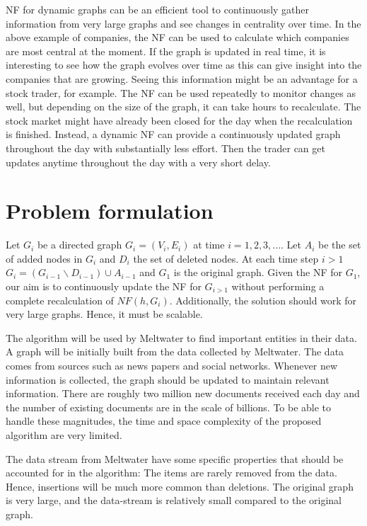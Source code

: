 NF for dynamic graphs can be an efficient tool to continuously gather information from very large graphs and see changes in centrality over time. In the above example of companies, the NF can be used to calculate which companies are most central at the moment. If the graph is updated in real time, it is interesting to see how the graph evolves over time as this can give insight into the companies that are growing. Seeing this information might be an advantage for a stock trader, for example. The NF can be used repeatedly to monitor changes as well, but depending on the size of the graph, it can take hours to recalculate. The stock market might have already been closed for the day when the recalculation is finished. Instead, a dynamic NF can provide a continuously updated graph throughout the day with substantially less effort. Then the trader can get updates anytime throughout the day with a very short delay.

\section{Problem formulation}
Let $G_i$ be a directed graph $G_i = (V_i,E_i)$ at time $i = 1,2,3,...$.
Let $A_i$ be the set of added nodes in $G_i$ and $D_i$ the set of deleted nodes. 
At each time step $i > 1$ $G_i = (G_{i-1} \backslash D_{i-1}) \cup A_{i-1}$ and $G_1$ is the original graph. Given the NF for $G_1$, our aim is to continuously update the NF for $G_{i>1}$ without performing a complete recalculation of $NF(h,G_i)$. Additionally, the solution should work for very large graphs. Hence, it must be scalable. 

The algorithm will be used by Meltwater to find important entities in their data. A graph will be initially built from the data collected by Meltwater. The data comes from sources such as news papers and social networks. Whenever new information is collected, the graph should be updated to maintain relevant information. There are roughly two million new documents received each day and the number of existing documents are in the scale of billions. To be able to handle these magnitudes, the time and space complexity of the proposed algorithm are very limited.

The data stream from Meltwater have some specific properties that should be accounted for in the algorithm: The items are rarely removed from the data. Hence, insertions will be much more common than deletions. The original graph is very large, and the data-stream is relatively small compared to the original graph. 

